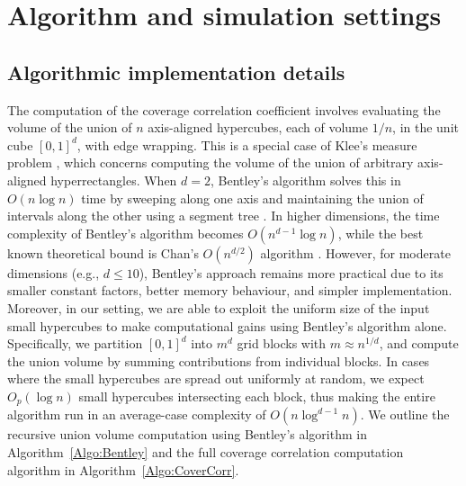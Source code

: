 \documentclass[11pt]{article}
\begin{document}
\section{Algorithm and simulation settings}

\subsection{Algorithmic implementation details}
\label{Sec:Algorithm}
The computation of the coverage correlation coefficient involves evaluating the volume of the union of $n$ axis-aligned hypercubes, each of volume $1/n$, in the unit cube $[0,1]^d$, with edge wrapping. This is a special case of Klee's measure problem \citep{klee1977can}, which concerns computing the volume of the union of arbitrary axis-aligned hyperrectangles. When $d=2$, Bentley's algorithm solves this in $O(n\log n)$ time by sweeping along one axis and maintaining the union of intervals along the other using a segment tree \citep{ben1983lower}. In higher dimensions, the time complexity of Bentley's algorithm becomes $O(n^{d-1} \log n)$, while the best known theoretical bound is Chan's $O(n^{d/2})$ algorithm \citep{chan2013klee}. However, for moderate dimensions (e.g., $d \leq 10$), Bentley's approach remains more practical due to its smaller constant factors, better memory behaviour, and simpler implementation.  Moreover, in our setting, we are able to exploit the uniform size of the input small hypercubes to make computational gains using Bentley's algorithm alone. Specifically, we partition $[0,1]^d$ into $m^d$ grid blocks with $m \approx n^{1/d}$, and compute the union volume by summing contributions from individual blocks.
In cases where the small hypercubes are spread out uniformly at random, we expect $O_p(\log n)$ small hypercubes intersecting each block, thus making the entire algorithm run in an average-case complexity of $O(n\log^{d-1} n)$. We outline the recursive union volume computation using Bentley's algorithm in Algorithm~\ref{Algo:Bentley} and the full coverage correlation computation algorithm in Algorithm~\ref{Algo:CoverCorr}.
\end{document}
